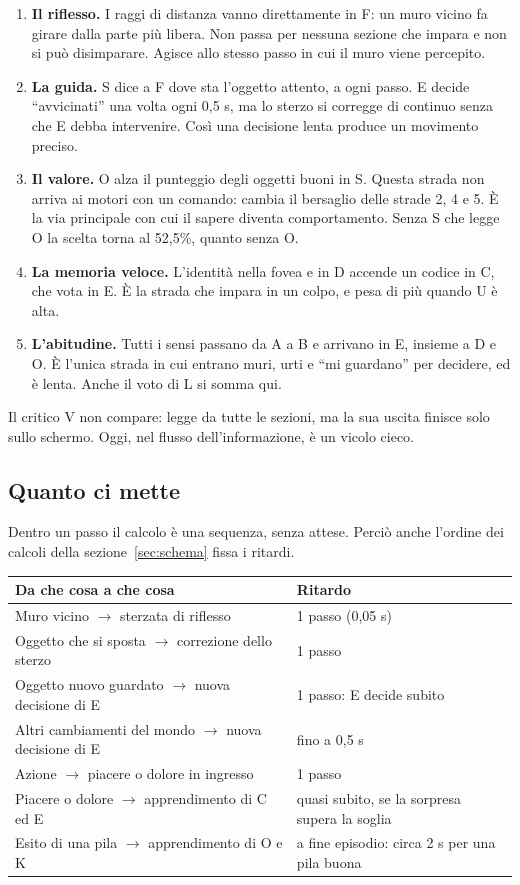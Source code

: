 \documentclass[11pt,a4paper]{article}
\begin{document}
\begin{enumerate}
\item \textbf{Il riflesso.} I raggi di distanza vanno direttamente in F: un muro vicino fa
  girare dalla parte più libera. Non passa per nessuna sezione che impara e non si può
  disimparare. Agisce allo stesso passo in cui il muro viene percepito.
\item \textbf{La guida.} S dice a F dove sta l'oggetto attento, a ogni passo. E decide
  ``avvicinati'' una volta ogni 0,5 s, ma lo sterzo si corregge di continuo senza che E
  debba intervenire. Così una decisione lenta produce un movimento preciso.
\item \textbf{Il valore.} O alza il punteggio degli oggetti buoni in S. Questa strada non
  arriva ai motori con un comando: cambia il bersaglio delle strade 2, 4 e 5. È la via
  principale con cui il sapere diventa comportamento. Senza S che legge O la scelta
  torna al 52,5\%, quanto senza O.
\item \textbf{La memoria veloce.} L'identità nella fovea e in D accende un codice in C,
  che vota in E. È la strada che impara in un colpo, e pesa di più quando U è alta.
\item \textbf{L'abitudine.} Tutti i sensi passano da A a B e arrivano in E, insieme a D e O.
  È l'unica strada in cui entrano muri, urti e ``mi guardano'' per decidere, ed è lenta.
  Anche il voto di L si somma qui.
\end{enumerate}

Il critico V non compare: legge da tutte le sezioni, ma la sua uscita finisce solo sullo
schermo. Oggi, nel flusso dell'informazione, è un vicolo cieco.

\subsection{Quanto ci mette}

Dentro un passo il calcolo è una sequenza, senza attese. Perciò anche l'ordine dei calcoli
della sezione~\ref{sec:schema} fissa i ritardi.

\begin{center}
\small
\begin{tabularx}{\textwidth}{@{}Yl@{}}
\toprule
\textbf{Da che cosa a che cosa} & \textbf{Ritardo} \\
\midrule
Muro vicino $\to$ sterzata di riflesso & 1 passo (0,05 s) \\
Oggetto che si sposta $\to$ correzione dello sterzo & 1 passo \\
Oggetto nuovo guardato $\to$ nuova decisione di E & 1 passo: E decide subito \\
Altri cambiamenti del mondo $\to$ nuova decisione di E & fino a 0,5 s \\
Azione $\to$ piacere o dolore in ingresso & 1 passo \\
Piacere o dolore $\to$ apprendimento di C ed E & quasi subito, se la sorpresa supera la soglia \\
Esito di una pila $\to$ apprendimento di O e K & a fine episodio: circa 2 s per una pila buona \\
\bottomrule
\end{tabularx}
\end{center}
\end{document}
